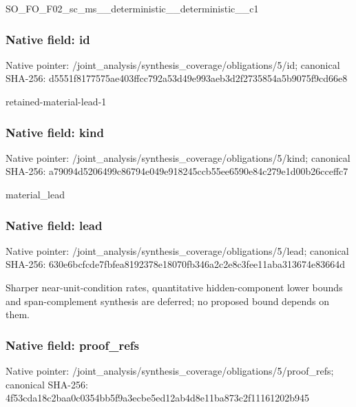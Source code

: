 \documentclass[10pt,a4paper]{article}
\begin{document}
\begingroup\raggedright\sloppy SO\_\allowbreak{}FO\_\allowbreak{}F02\_\allowbreak{}sc\_\allowbreak{}ms\_\allowbreak{}\_\allowbreak{}deterministic\_\allowbreak{}\_\allowbreak{}deterministic\_\allowbreak{}\_\allowbreak{}c1\par\endgroup

\subsubsection{Native field: id}
Native pointer: /joint\_\allowbreak{}analysis/synthesis\_\allowbreak{}coverage/obligations/5/id; canonical SHA-256: d5551f8177575ae403ffcc792a53d49e993aeb3d2f2735854a5b9075f9cd66e8

\begingroup\raggedright\sloppy retained-material-lead-1\par\endgroup

\subsubsection{Native field: kind}
Native pointer: /joint\_\allowbreak{}analysis/synthesis\_\allowbreak{}coverage/obligations/5/kind; canonical SHA-256: a79094d5206499c86794e049e918245ccb55ee6590e84c279e1d00b26cceffc7

\begingroup\raggedright\sloppy material\_\allowbreak{}lead\par\endgroup

\subsubsection{Native field: lead}
Native pointer: /joint\_\allowbreak{}analysis/synthesis\_\allowbreak{}coverage/obligations/5/lead; canonical SHA-256: 630e6bcfcde7fbfea8192378e18070fb346a2c2e8c3fee11aba313674e83664d

\begingroup\raggedright\sloppy Sharper near-unit-condition rates,\allowbreak{} quantitative hidden-component lower bounds and span-complement synthesis are deferred;\allowbreak{} no proposed bound depends on them.\par\endgroup

\subsubsection{Native field: proof\_\allowbreak{}refs}
Native pointer: /joint\_\allowbreak{}analysis/synthesis\_\allowbreak{}coverage/obligations/5/proof\_\allowbreak{}refs; canonical SHA-256: 4f53cda18c2baa0c0354bb5f9a3ecbe5ed12ab4d8e11ba873c2f11161202b945
\end{document}
